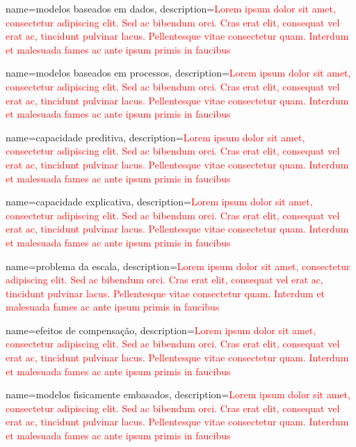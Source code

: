 {
    name=modelos baseados em dados,
    description={\textcolor{red}{Lorem ipsum dolor sit amet, consectetur adipiscing elit. Sed ac bibendum orci. Cras erat elit, consequat vel erat ac, tincidunt pulvinar lacus. Pellentesque vitae consectetur quam. Interdum et malesuada fames ac ante ipsum primis in faucibus}}
}

{
    name=modelos baseados em processos,
    description={\textcolor{red}{Lorem ipsum dolor sit amet, consectetur adipiscing elit. Sed ac bibendum orci. Cras erat elit, consequat vel erat ac, tincidunt pulvinar lacus. Pellentesque vitae consectetur quam. Interdum et malesuada fames ac ante ipsum primis in faucibus}}
}

{
    name=capacidade preditiva,
    description={\textcolor{red}{Lorem ipsum dolor sit amet, consectetur adipiscing elit. Sed ac bibendum orci. Cras erat elit, consequat vel erat ac, tincidunt pulvinar lacus. Pellentesque vitae consectetur quam. Interdum et malesuada fames ac ante ipsum primis in faucibus}}
}

{
    name=capacidade explicativa,
    description={\textcolor{red}{Lorem ipsum dolor sit amet, consectetur adipiscing elit. Sed ac bibendum orci. Cras erat elit, consequat vel erat ac, tincidunt pulvinar lacus. Pellentesque vitae consectetur quam. Interdum et malesuada fames ac ante ipsum primis in faucibus}}
}

{
    name=problema da escala,
    description={\textcolor{red}{Lorem ipsum dolor sit amet, consectetur adipiscing elit. Sed ac bibendum orci. Cras erat elit, consequat vel erat ac, tincidunt pulvinar lacus. Pellentesque vitae consectetur quam. Interdum et malesuada fames ac ante ipsum primis in faucibus}}
}

{
	name=efeitos de compensação,
	description={\textcolor{red}{Lorem ipsum dolor sit amet, consectetur adipiscing elit. Sed ac bibendum orci. Cras erat elit, consequat vel erat ac, tincidunt pulvinar lacus. Pellentesque vitae consectetur quam. Interdum et malesuada fames ac ante ipsum primis in faucibus}}
}

{
	name=modelos fisicamente embasados,
	description={\textcolor{red}{Lorem ipsum dolor sit amet, consectetur adipiscing elit. Sed ac bibendum orci. Cras erat elit, consequat vel erat ac, tincidunt pulvinar lacus. Pellentesque vitae consectetur quam. Interdum et malesuada fames ac ante ipsum primis in faucibus}}
}

